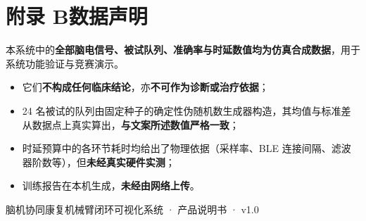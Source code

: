 \documentclass[11pt, a4paper]{ctexart}
\begin{document}
\section*{附录 B\quad 数据声明}

\begin{warnbox}
本系统中的\textbf{全部脑电信号、被试队列、准确率与时延数值均为仿真合成数据}，用于系统功能验证与竞赛演示。

\begin{itemize}[itemsep=3pt, topsep=4pt]
  \item 它们\textbf{不构成任何临床结论}，亦\textbf{不可作为诊断或治疗依据}；
  \item 24 名被试的队列由固定种子的确定性伪随机数生成器构造，其均值与标准差从数据点上真实算出，\textbf{与文案所述数值严格一致}；
  \item 时延预算中的各环节耗时均给出了物理依据（采样率、BLE 连接间隔、滤波器阶数等），但\textbf{未经真实硬件实测}；
  \item 训练报告在本机生成，\textbf{未经由网络上传}。
\end{itemize}
\end{warnbox}

\vfill
\begin{center}
\color{brandgrey}\sffamily\small
脑机协同康复机械臂闭环可视化系统 · 产品说明书 · v1.0
\end{center}
\end{document}

